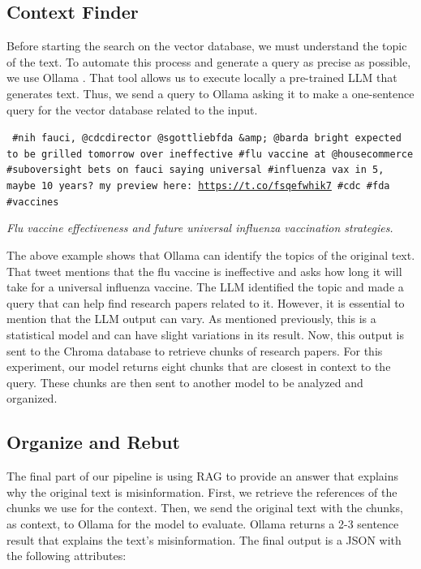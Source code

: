 \subsection{Context Finder}
Before starting the search on the vector database, we must understand the topic of the text. To automate this process and generate a query as precise as possible, we use Ollama \cite{ollama}. That tool allows us to execute locally a pre-trained LLM that generates text. Thus, we send a query to Ollama asking it to make a one-sentence query for the vector database related to the input.

 
 \begin{tcolorbox}[colback=gray!10, colframe=black!70, title=Input]
\texttt{%
\#nih fauci, @cdcdirector @sgottliebfda \&amp; @barda bright expected to be grilled tomorrow over ineffective \#flu vaccine at @housecommerce \#suboversight bets on fauci saying universal \#influenza vax in 5, maybe 10 years? my preview here: \url{https://t.co/fsqefwhik7} \#cdc \#fda \#vaccines%
}
\end{tcolorbox}

\begin{tcolorbox}[colback=white, colframe=black!70, title=Output]
\textit{%
Flu vaccine effectiveness and future universal influenza vaccination strategies.%
}
\end{tcolorbox}
 
The above example shows that Ollama can identify the topics of the original text. That tweet mentions that the flu vaccine is ineffective and asks how long it will take for a universal influenza vaccine. The LLM identified the topic and made a query that can help find
research papers related to it. However, it is essential to mention that the LLM output can vary. As mentioned previously, this is a statistical model and can have slight variations in its result. Now, this output is sent to the Chroma database to retrieve chunks of research
papers. For this experiment, our model returns eight chunks that are closest in context to the query. These chunks are then sent to another model to be analyzed and organized.

\subsection{Organize and Rebut}
The final part of our pipeline is using RAG to provide an answer that explains why the original text is misinformation. First, we retrieve the references of the chunks we use for the context. Then, we send the original text with the chunks, as context, to Ollama for
the model to evaluate. Ollama returns a 2-3 sentence result that explains the text’s misinformation. The final output is a JSON with the following attributes:

